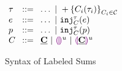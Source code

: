 
\begin{figure}[ht]
  $\arraycolsep=4pt\begin{array}{lll}
      \tau & ::= & \ldots ~\vert~ \tlabeledsum{C_i(\tau_i)}_{C_i \in \C} \\
      e    & ::= & \ldots ~\vert~ \hinj{C}{\tau}{e}                            \\
      p    & ::= & \ldots ~\vert~ \hinjp{C}{\tau}{p}                       \\
      C    & ::= & \tagC ~\vert~ \tagehole{u} ~\vert~ \taghole{\tagC}{u}
    \end{array}$
  \caption{Syntax of Labeled Sums}
  \label{fig:labeled-sums-syntax}
\end{figure}
